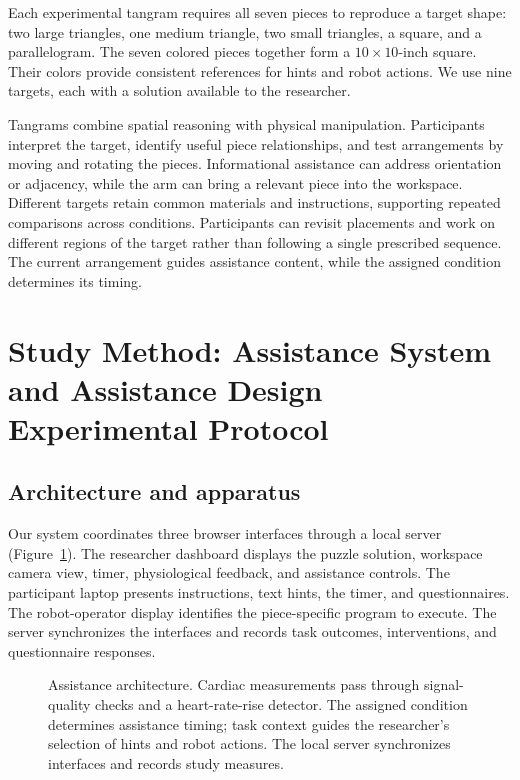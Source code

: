 \documentclass[sigconf,anonymous,balance=false]{aamas}
\providecommand{\DIFadd}[1]{{\protect\color{blue} \sf #1}} %
\providecommand{\DIFdel}[1]{{\protect\color{red} \scriptsize #1}} %
\providecommand{\DIFaddbegin}{} %
\providecommand{\DIFaddend}{} %
\providecommand{\DIFdelbegin}{} %
\providecommand{\DIFdelend}{} %
\begin{document}
Each experimental tangram requires all seven pieces to reproduce a target shape: two large triangles, one medium triangle, two small triangles, a square, and a parallelogram. The seven colored pieces together form a $10\times10$-inch square. Their colors provide consistent references for hints and robot actions. We use nine targets, each with a solution available to the researcher.

Tangrams combine spatial reasoning with physical manipulation. Participants interpret the target, identify useful piece relationships, and test arrangements by moving and rotating the pieces. Informational assistance can address orientation or adjacency, while the arm can bring a relevant piece into the workspace. Different targets retain common materials and instructions, supporting repeated comparisons across conditions. Participants can revisit placements and work on different regions of the target rather than following a single prescribed sequence. The current arrangement guides assistance content, while the assigned condition determines its timing.

\section{\DIFaddbegin \DIFadd{Study Method: Assistance }\DIFaddend System and \DIFdelbegin \DIFdel{Assistance Design}\DIFdelend \DIFaddbegin \DIFadd{Experimental Protocol}\DIFaddend }

\subsection{Architecture and apparatus}

Our system coordinates three browser interfaces through a local server (Figure~\ref{fig:architecture}). The researcher dashboard displays the puzzle solution, workspace camera view, timer, physiological feedback, and assistance controls. The participant laptop presents instructions, text hints, the timer, and questionnaires. The robot-operator display identifies the piece-specific program to execute. The server synchronizes the interfaces and records task outcomes, interventions, and questionnaire responses.

\begin{figure}[t]
\centering
\begingroup
\resizebox{.96\textwidth}{!}{}
\endgroup
\caption{Assistance architecture. Cardiac measurements pass through signal-quality checks and a heart-rate-rise detector. The assigned condition determines assistance timing; task context guides the researcher’s selection of hints and robot actions. The local server synchronizes interfaces and records study measures.}
\label{fig:architecture}
\end{figure}
\end{document}
